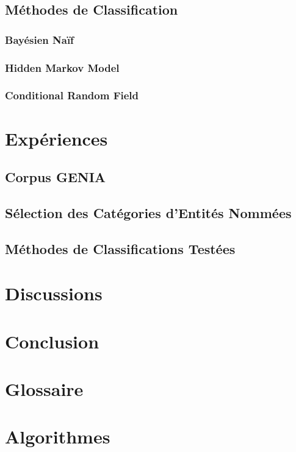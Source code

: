 \documentclass[11pt,a4paper]{report}
\begin{document}
	\section{Méthodes de Classification}
		\subsection{Bayésien Naïf}
  		\subsection{Hidden Markov Model}
  		\subsection{Conditional Random Field}
  
  
\chapter{Expériences}
  	\section{Corpus GENIA}
  		
  	\section{Sélection des Catégories d'Entités Nommées}
  	\section{Méthodes de Classifications Testées}

\chapter{Discussions}


\chapter*{Conclusion}
	
	
\begin{appendices}
	\chapter{Glossaire}
		
	\chapter{Algorithmes}

	
	
\end{appendices}
\newpage
\newpage
\newpage
\end{document}
